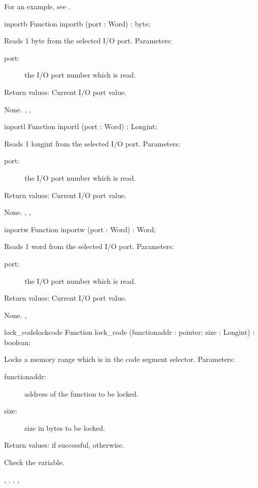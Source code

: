 For an example, see .
\begin{function}{inportb}
\Declaration
Function inportb (port : Word) : byte;

\Description
Reads 1 byte from the selected I/O port.
Parameters: 
\begin{description}
\item[port:\ ] the I/O port number which is read.
\end{description}
Return values: Current I/O port value.

\Errors
 None. 
\SeeAlso
{}, , 
\end{function}
\begin{function}{inportl}
\Declaration
Function inportl (port : Word) : Longint;

\Description

Reads 1 longint from the selected I/O port.
Parameters: 
\begin{description}
\item[port:\ ] the I/O port number which is read.
\end{description}
Return values: Current I/O port value.

\Errors
None. 
\SeeAlso
{}, ,  
\end{function}
\begin{function}{inportw}
\Declaration
Function inportw (port : Word) : Word;

\Description

Reads 1 word from the selected I/O port.
Parameters: 
\begin{description}
\item[port:\ ] the I/O port number which is read.
\end{description}
Return values: Current I/O port value.

\Errors
 None. 
\SeeAlso
{} ,  
\end{function}
\begin{functionl}{lock\_code}{lockcode}
\Declaration
Function lock\_code (functionaddr : pointer; size : Longint) : boolean;

\Description
Locks a memory range which is in the code segment selector.
Parameters: 
\begin{description}
\item[functionaddr:\ ] address of the function to be locked.
\item[size:\ ] size in bytes to be locked.
\end{description}
Return values:  if successful,  otherwise.

\Errors
Check the  variable.
\SeeAlso
 
,
,
,
,
\end{functionl}
